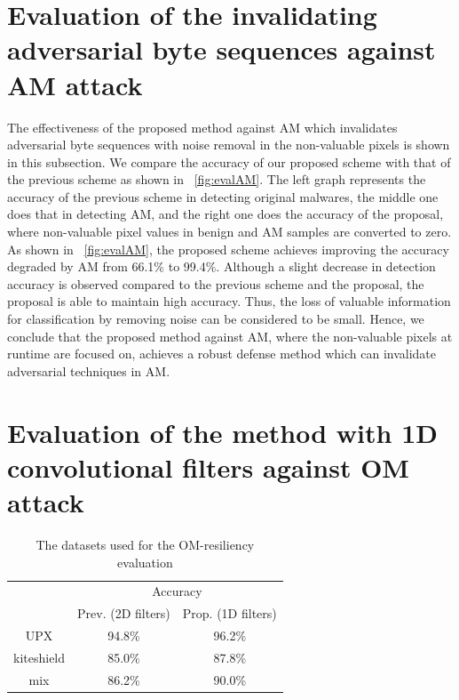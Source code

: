 \section{Evaluation of the invalidating adversarial byte sequences against AM attack}
The effectiveness of the proposed method against AM which invalidates adversarial byte sequences with noise removal in the non-valuable pixels is shown in this subsection.
We compare the accuracy of our proposed scheme with that of the previous scheme as shown in \figurename~\ref{fig:evalAM}.
The left graph represents the accuracy of the previous scheme in detecting original malwares, the middle one does that in detecting AM, and the right one does the accuracy of the proposal, where non-valuable pixel values in benign and AM samples are converted to zero.
As shown in \figurename~\ref{fig:evalAM}, the proposed scheme achieves improving the accuracy degraded by AM from 66.1\% to 99.4\%.
Although a slight decrease in detection accuracy is observed compared to the previous scheme and the proposal, the proposal is able to maintain high accuracy.
Thus, the loss of valuable information for classification by removing noise can be considered to be small.
Hence, we conclude that the proposed method against AM, where the non-valuable pixels at runtime are focused on, achieves a robust defense method which can invalidate adversarial techniques in AM.

\section{Evaluation of the method with 1D convolutional filters against OM attack}
\begin{table}[p]
  \begin{center}
    \vspace{-8pt} 
    \caption{The datasets used for the OM-resiliency evaluation}
    \label{tab:evalOM} 
    \begin{tabular}{|c|c|c|} \hline
      \multirow{2}{*}{\hfill  \hfill} & \multicolumn{2}{c|}{Accuracy}  \\ \cline{2-3} 
					     & Prev. (2D filters) & Prop. (1D filters) \\ \hline \hline
      UPX & 94.8\% & 96.2\% \\ \cline{1-3} 
      kiteshield & 85.0\% & 87.8\% \\ \cline{1-3} 
      mix & 86.2\% & 90.0\% \\ \cline{1-3} 
  \end{tabular}
  \end{center}
\end{table}

